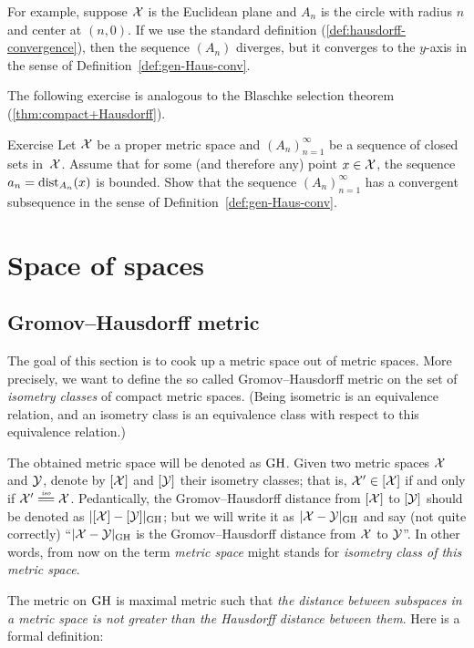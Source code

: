 For example, suppose $\mathcal{X}$ is the Euclidean plane and $A_n$ is the circle with radius $n$ and center at $(n,0)$.
If we use the standard definition (\ref{def:hausdorff-convergence}), then the sequence $(A_n)$ diverges, but it converges to the $y$-axis in the sense of Definition~\ref{def:gen-Haus-conv}.

The following exercise is analogous to the Blaschke selection theorem (\ref{thm:compact+Hausdorff}).

\begin{thm}{Exercise}
Let $\mathcal{X}$ be a proper metric space
and $(A_n)_{n=1}^\infty$ be a sequence of closed sets in~$\mathcal{X}$.
Assume that for some (and therefore any) point  $x\in\mathcal{X}$, 
the sequence $a_n=\mathrm{dist}_{A_n}(x)$ is bounded.
Show that the sequence  $(A_n)_{n=1}^\infty$ has a convergent subsequence in the sense of Definition~\ref{def:gen-Haus-conv}.
\end{thm}

\chapter{Space of spaces}

\section{Gromov--Hausdorff metric}

The goal of this section is to cook up a metric space out of metric spaces.
More precisely, we want to define the so called  Gromov--Hausdorff metric on the set of {}\emph{isometry classes} of compact metric spaces.
(Being isometric is an equivalence relation, 
and an isometry class is an equivalence class with respect to this equivalence relation.)

The obtained metric space will be denoted as $\operatorname{\rm GH}\nolimits$.
Given two metric spaces $\mathcal{X}$ and $\mathcal{Y}$,
denote by $[\mathcal{X}]$ and $[\mathcal{Y}]$ their isometry classes;
that is, $\mathcal{X}'\in [\mathcal{X}]$ if and only if $\spc{X}'\iso \spc{X}$.
Pedantically, the Gromov--Hausdorff distance from $[\mathcal{X}]$ 
to $[\mathcal{Y}]$ should be denoted as $|[\mathcal{X}]-[\mathcal{Y}]|_{\operatorname{\rm GH}\nolimits}$;
but we will write it as $|\mathcal{X}-\mathcal{Y}|_{\operatorname{\rm GH}\nolimits}$ and say (not quite correctly) 
``$|\mathcal{X}-\mathcal{Y}|_{\operatorname{\rm GH}\nolimits}$ is the Gromov--Hausdorff distance from  $\mathcal{X}$ 
to  $\mathcal{Y}$''.
In other words, from now on the term {}\emph{metric space} might stands for {}\emph{isometry class of this metric space}.

The metric on $\operatorname{\rm GH}\nolimits$ is maximal metric such that {}\emph{the distance between subspaces in a metric space is not greater than the Hausdorff distance between them}.
Here is a formal definition:

